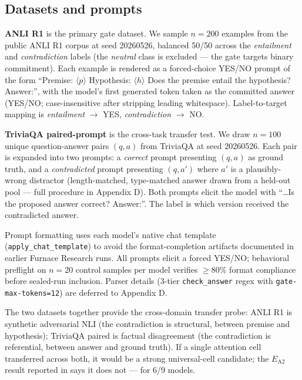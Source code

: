 \documentclass[10pt, letterpaper]{article}
\newcommand{\ea}[1]{$E_{\text{A}#1}$}
\begin{document}
\subsection{Datasets and prompts}
\label{sec:setup:datasets}

\textbf{ANLI R1} is the primary gate dataset. We sample $n{=}200$
examples from the public ANLI R1 corpus at seed 20260526, balanced
50/50 across the \emph{entailment} and \emph{contradiction} labels
(the \emph{neutral} class is excluded --- the gate targets binary
commitment). Each example is rendered as a forced-choice YES/NO
prompt of the form ``Premise: $\langle p \rangle$ Hypothesis:
$\langle h \rangle$ Does the premise entail the hypothesis?
Answer:'', with the model's first generated token taken as the
committed answer (YES/NO; case-insensitive after stripping leading
whitespace). Label-to-target mapping is \emph{entailment} $\to$ YES,
\emph{contradiction} $\to$ NO.

\textbf{TriviaQA paired-prompt} is the cross-task transfer test. We
draw $n{=}100$ unique question-answer pairs $(q, a)$ from TriviaQA at
seed 20260526. Each pair is expanded into two prompts: a
\emph{correct} prompt presenting $(q, a)$ as ground truth, and a
\emph{contradicted} prompt presenting $(q, a')$ where $a'$ is a
plausibly-wrong distractor (length-matched, type-matched answer drawn
from a held-out pool --- full procedure in Appendix D). Both prompts
elicit the model with ``\ldots Is the proposed answer correct?
Answer:''. The label is which version received the contradicted
answer.

Prompt formatting uses each model's native chat template
(\texttt{apply\_chat\_template}) to avoid the format-completion
artifacts documented in earlier Furnace Research runs. All
prompts elicit a forced YES/NO; behavioral preflight on $n{=}20$
control samples per model verifies $\geq 80\%$ format compliance
before sealed-run inclusion. Parser details (3-tier
\texttt{check\_answer} regex with \texttt{gate-max-tokens=12}) are
deferred to Appendix D.

The two datasets together provide the cross-domain transfer probe:
ANLI R1 is synthetic adversarial NLI (the contradiction is
structural, between premise and hypothesis); TriviaQA paired is
factual disagreement (the contradiction is referential, between
answer and ground truth). If a single attention cell transferred
across both, it would be a strong universal-cell candidate; the
\ea{2} result reported in  says it does
not --- for 6/9 models.
\end{document}
